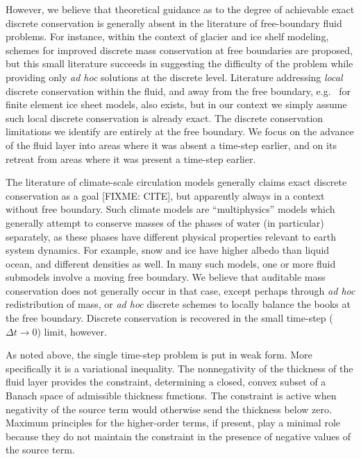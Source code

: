 \documentclass[final,leqno,onefignum,onetabnum]{siamltex1213bueler}
\begin{document}
However, we believe that theoretical guidance as to the degree of achievable exact discrete conservation is generally absent in the literature of free-boundary fluid problems.  For instance, within the context of glacier \cite{JaroschSchoofAnslow2013} and ice shelf \cite{Albrechtetal2011} modeling, schemes for improved discrete mass conservation at free boundaries are proposed, but this small literature succeeds in suggesting the difficulty of the problem while providing only \emph{ad hoc} solutions at the discrete level.  Literature addressing \emph{local} discrete conservation within the fluid, and away from the free boundary, e.g.~\cite{Lengetal2014} for finite element ice sheet models, also exists, but in our context we simply assume such local discrete conservation is already exact.  The discrete conservation limitations we identify are entirely at the free boundary.  We focus on the advance of the fluid layer into areas where it was absent a time-step earlier, and on its retreat from areas where it was present a time-step earlier.

The literature of climate-scale circulation models generally claims exact discrete conservation as a goal [FIXME: CITE], but apparently always in a context without free boundary.  Such climate models are ``multiphysics'' models which generally attempt to conserve masses of the phases of water (in particular) separately, as these phases have different physical properties relevant to earth system dynamics.  For example, snow and ice have higher albedo than liquid ocean, and different densities as well.  In many such models, one or more fluid submodels involve a moving free boundary.  We believe that auditable mass conservation does not generally occur in that case, except perhaps through \emph{ad hoc} redistribution of mass, or \emph{ad hoc} discrete schemes to locally balance the books at the free boundary.  Discrete conservation is recovered in the small time-step ($\Delta t \to 0$) limit, however.

As noted above, the single time-step problem is put in weak form.  More specifically it is a variational inequality.  The nonnegativity of the thickness of the fluid layer provides the constraint, determining a closed, convex subset of a Banach space of admissible thickness functions.  The constraint is active when negativity of the source term would otherwise send the thickness below zero.  Maximum principles for the higher-order terms, if present, play a minimal role because they do not maintain the constraint in the presence of negative values of the source term.
\end{document}
